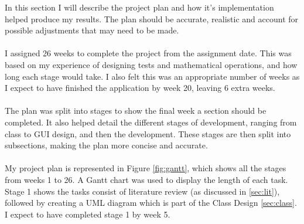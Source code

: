 \documentclass[final]{cmpreport}
\begin{document}
	In this section I will describe the project plan and how it's implementation helped produce my results. The plan should be accurate, realistic and account for possible adjustments that may need to be made.\\
	\\I assigned 26 weeks to complete the project from the assignment date. This was based on my experience of designing tests and mathematical operations, and how long each stage would take. I also felt this was an appropriate number of weeks as I expect to have finished the application by week 20, leaving 6 extra weeks.\\
	\\The plan was split into stages to show the final week a section should be completed. It also helped detail the different stages of development, ranging from class to GUI design, and then the development. These stages are then split into subsections, making the plan more concise and accurate. \\
	\\My project plan is represented in Figure \ref{fig:gantt}, which shows all the stages from weeks 1 to 26. A Gantt chart was used to display the length of each task. Stage 1 shows the tasks consist of literature review (as discussed in \ref{sec:lit}), followed by creating a UML diagram which is part of the Class Design \ref{sec:class}. I expect to have completed stage 1 by week 5.\\
	\renewcommand\sfdefault{phv}
	\renewcommand\mddefault{mc}
	\renewcommand\bfdefault{bc}
	\sffamily
\end{document}
